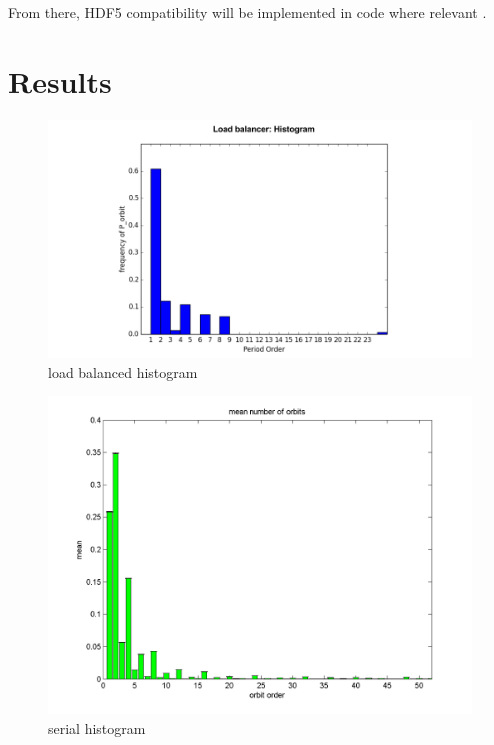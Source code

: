 \documentclass[12pt]{article}
\begin{document}
From there, HDF5 compatibility will be implemented in code where
relevant \cite{folk} \cite{UserGuide}. 
\section{Results}
\begin{figure}[H]
	\begin{center}
		\includegraphics[scale=0.4]{hist}
\caption{load balanced histogram}
	\end{center}
\end{figure}
\begin{figure}[H]
	\begin{center}
		\includegraphics[scale=0.5]{serial_hist}
\caption{serial histogram}
	\end{center}
\end{figure}
\end{document}
